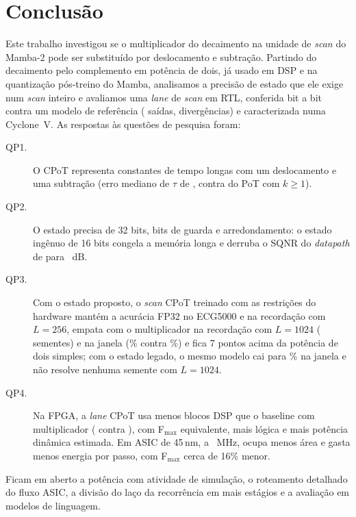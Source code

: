 \documentclass[12pt]{article}
\begin{document}
\section{Conclusão}
\label{sec:conc}

Este trabalho investigou se o multiplicador do decaimento na unidade de \emph{scan} do Mamba-2 pode ser substituído por deslocamento e subtração. Partindo do decaimento pelo complemento em potência de dois, já usado em DSP e na quantização pós-treino do Mamba, analisamos a precisão de estado que ele exige num \emph{scan} inteiro e avaliamos uma \emph{lane} de \emph{scan} em RTL, conferida bit a bit contra um modelo de referência (\VerTotal{} saídas, \VerMism{} divergências) e caracterizada numa Cyclone~V. As respostas às questões de pesquisa foram:
\begin{description}
  \item[QP1.] O CPoT representa constantes de tempo longas com um deslocamento e uma subtração (erro mediano de $\tau$ de \TauErrCpot{}, contra \TauErrPot{} do PoT com $k\geq1$).
  \item[QP2.] O estado precisa de 32 bits, bits de guarda e arredondamento: o estado ingênuo de 16 bits congela a memória longa e derruba o SQNR do \emph{datapath} de \SqnrProposed{} para \SqnrLegacy~dB.
  \item[QP3.] Com o estado proposto, o \emph{scan} CPoT treinado com as restrições do hardware mantém a acurácia FP32 no ECG5000 e na recordação com $L=256$, empata com o multiplicador na recordação com $L=1024$ ( sementes) e na janela (\% contra \%) e fica 7 pontos acima da potência de dois simples; com o estado legado, o mesmo modelo cai para \% na janela e não resolve nenhuma semente com $L=1024$.
  \item[QP4.] Na FPGA, a \emph{lane} CPoT usa \DspSaving{} menos blocos DSP que o baseline com multiplicador (\DspCpot{} contra \DspMult), com F$_{\max}$ equivalente, mais lógica e mais potência dinâmica estimada. Em ASIC de 45\,nm, a \AsicIsoMhz~MHz, ocupa \AsicAreaSaving{} menos área e gasta \AsicEnergySaving{} menos energia por passo, com F$_{\max}$ cerca de 16\% menor.
\end{description}
Ficam em aberto a potência com atividade de simulação, o roteamento detalhado do fluxo ASIC, a divisão do laço da recorrência em mais estágios e a avaliação em modelos de linguagem.



\end{document}
